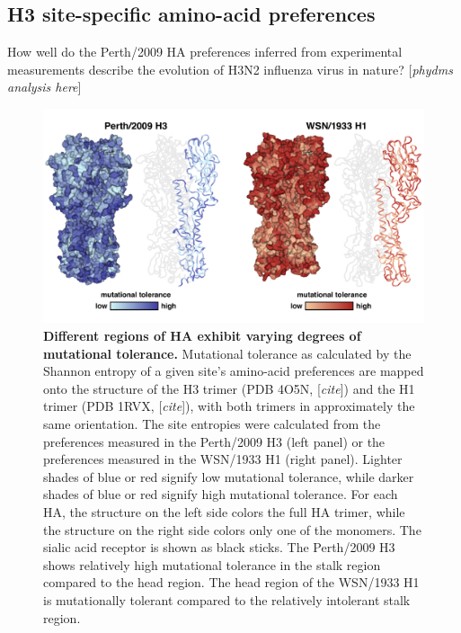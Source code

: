 \documentclass[11pt]{article}
\newcommand{\comment}[1]{{\color{red}[\textsl{#1}]}}
\begin{document}
\subsection*{H3 site-specific amino-acid preferences}
How well do the Perth/2009 HA preferences inferred from experimental measurements describe the evolution of H3N2 influenza virus in nature?
\comment{phydms analysis here}

\begin{figure}
\centerline{\includegraphics[width=\textwidth]{figs/mut_tolerance/entropy_heatmap.pdf}}
\caption{\label{fig:mut_tolerance}
{\bf Different regions of HA exhibit varying degrees of mutational tolerance.}
Mutational tolerance as calculated by the Shannon entropy of a given site's amino-acid preferences are mapped onto the structure of the H3 trimer (PDB 4O5N, \comment{cite}) and the H1 trimer (PDB 1RVX, \comment{cite}), with both trimers in approximately the same orientation. 
The site entropies were calculated from the preferences measured in the Perth/2009 H3 (left panel) or the preferences measured in the WSN/1933 H1 (right panel). 
Lighter shades of blue or red signify low mutational tolerance, while darker shades of blue or red signify high mutational tolerance. 
For each HA, the structure on the left side colors the full HA trimer, while the structure on the right side colors only one of the monomers.
The sialic acid receptor is shown as black sticks.
The Perth/2009 H3 shows relatively high mutational tolerance in the stalk region compared to the head region. 
The head region of the WSN/1933 H1 is mutationally tolerant compared to the relatively intolerant stalk region. 
}
\end{figure}
\end{document}
